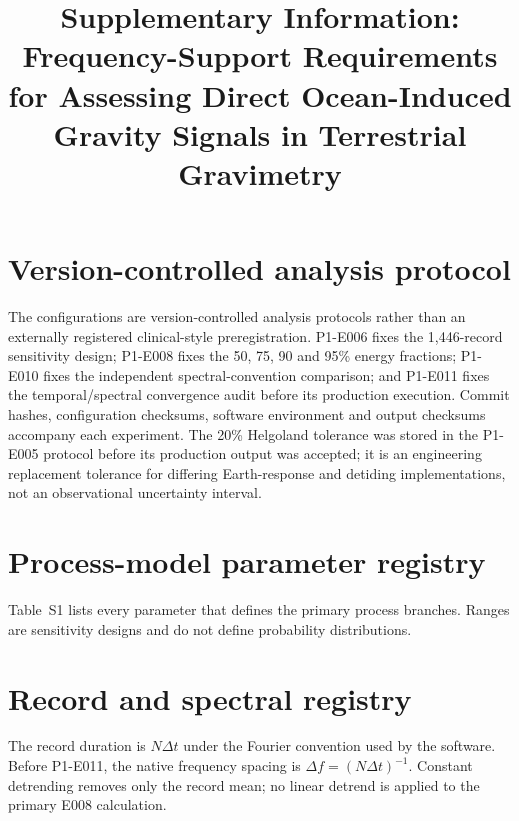\documentclass[11pt]{article}
\title{Supplementary Information: Frequency-Support Requirements for Assessing Direct Ocean-Induced Gravity Signals in Terrestrial Gravimetry}
\date{}
\begin{document}
\maketitle

\section{Version-controlled analysis protocol}
The configurations are version-controlled analysis protocols rather than an
externally registered clinical-style preregistration. P1-E006 fixes the
1,446-record sensitivity design; P1-E008 fixes the 50, 75, 90 and 95\% energy
fractions; P1-E010 fixes the independent spectral-convention comparison; and
P1-E011 fixes the temporal/spectral convergence audit before its production
execution. Commit hashes, configuration checksums, software environment and
output checksums accompany each experiment. The 20\% Helgoland tolerance was
stored in the P1-E005 protocol before its production output was accepted; it is
an engineering replacement tolerance for differing Earth-response and detiding
implementations, not an observational uncertainty interval.

\section{Process-model parameter registry}
Table~S1 lists every parameter that defines the primary process branches. Ranges
are sensitivity designs and do not define probability distributions.

\begin{table}[ht]
\centering
\caption{Process-model parameters for the P1-E006 direct-radial-gravity ensemble.}
\label{tab:s1-parameters}
\resizebox{\textwidth}{!}{}
\end{table}

\section{Record and spectral registry}
The record duration is $N\Delta t$ under the Fourier convention used by the
software. Before P1-E011, the native frequency spacing is
$\Delta f=(N\Delta t)^{-1}$. Constant detrending removes only the record mean;
no linear detrend is applied to the primary E008 calculation.

\begin{table}[ht]
\centering
\caption{Composition and native temporal resolution of all 1,446 records.}
\label{tab:s2-records}
\resizebox{\textwidth}{!}{}
\end{table}
\end{document}
